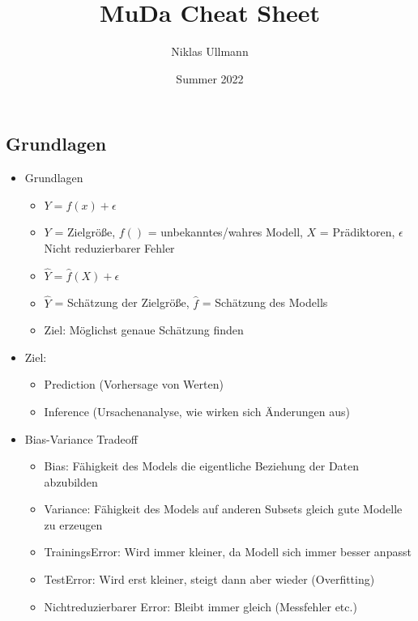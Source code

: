 \documentclass[a4paper]{article}
\title{MuDa Cheat Sheet}
\author{Niklas Ullmann}
\date{Summer 2022}
\begin{document}
\begin{landscape}
    \thispagestyle{empty}

    \begin{multicols}{3}
        \section{Grundlagen}
        \begin{itemize}[noitemsep,nolistsep,leftmargin=*]
            \item Grundlagen
            \begin{itemize}[noitemsep,nolistsep,leftmargin=*]
                \item\textbf{ $Y = f(x) + \epsilon$}
                \item $Y$ = Zielgröße, $f()$ = unbekanntes/wahres Modell, $X$ = Prädiktoren, $\epsilon$ Nicht reduzierbarer Fehler
                \item \textbf{$\hat{Y} = \hat{f}(X)+\epsilon$}
                \item $\hat{Y}$ = Schätzung der Zielgröße, $\hat{f}$ = Schätzung des Modells
                \item Ziel: Möglichst genaue Schätzung finden
            \end{itemize}
            \item Ziel:
            \begin{itemize}[noitemsep,nolistsep,leftmargin=*]
                \item Prediction (Vorhersage von Werten)
                \item Inference (Ursachenanalyse, wie wirken sich Änderungen aus)
            \end{itemize}
            \item Bias-Variance Tradeoff
            \begin{itemize}[noitemsep,nolistsep,leftmargin=*]
                \item Bias: Fähigkeit des Models die eigentliche Beziehung der Daten abzubilden
                \item Variance: Fähigkeit des Models auf anderen Subsets gleich gute Modelle zu erzeugen
                \item TrainingsError: Wird immer kleiner, da Modell sich immer besser anpasst
                \item TestError: Wird erst kleiner, steigt dann aber wieder (Overfitting)
                \item Nichtreduzierbarer Error: Bleibt immer gleich (Messfehler etc.)

\end{itemize}
\end{itemize}
\end{multicols}
\end{landscape}
\end{document}
